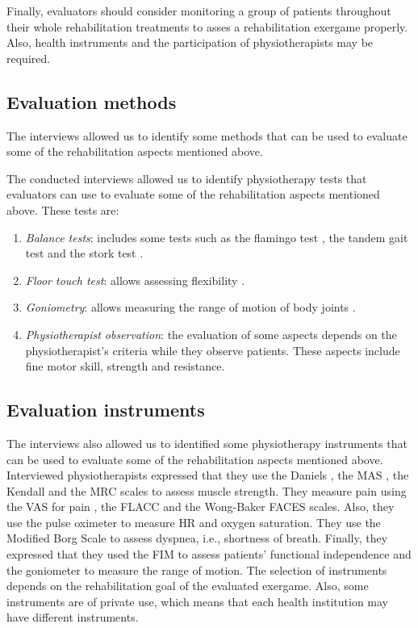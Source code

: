 Finally, evaluators should consider monitoring a group of patients throughout their whole rehabilitation treatments to asses a rehabilitation exergame properly. Also, health instruments and the participation of physiotherapists may be required.

\subsection{Evaluation methods}
\label{sec:rehab_methods}
The interviews allowed us to identify some methods that can be used to evaluate some of the rehabilitation aspects mentioned above. 

The conducted interviews allowed us to identify physiotherapy tests that evaluators can use to evaluate some of the rehabilitation aspects mentioned above. These tests are:

\begin{enumerate}
 \item \emph{Balance tests}: includes some tests such as the flamingo test \autocite{flamingo}, the tandem gait test \autocite{tandemGaitTest} and the stork test \autocite{storkTest}.
 
 \item \emph{Floor touch test}: allows assessing flexibility \autocite{floorTouch}.
 
 \item \emph{Goniometry}: allows measuring the range of motion of body joints \autocite{goniometry}.
 
 \item \emph{Physiotherapist observation}: the evaluation of some aspects depends on the physiotherapist's criteria while they observe patients. These aspects include fine motor skill, strength and resistance.
\end{enumerate}

\subsection{Evaluation instruments}
\label{sec:rehab_instruments}
The interviews also allowed us to identified some physiotherapy instruments that can be used to evaluate some of the rehabilitation aspects mentioned above. Interviewed physiotherapists expressed that they use the Daniels \autocite{danielsScale}, the \ac{MAS} \autocite{ashwortScale}, the Kendall and the \ac{MRC} \autocite{muscleStrenght} scales  to assess muscle strength. They measure pain using the \ac{VAS} for pain \autocite{painScales}, the \ac{FLACC} \autocite{flaccScale} and the Wong-Baker FACES \autocite{Baker} scales. Also, they use the pulse oximeter to measure \ac{HR} and oxygen saturation. They use the Modified Borg Scale to assess dyspnea, i.e., shortness of breath. Finally, they expressed that they used the \ac{FIM} \autocite{fim} to assess patients' functional independence and the goniometer \autocite{goniometry} to measure the range of motion. The selection of instruments depends on the rehabilitation goal of the evaluated exergame. Also, some instruments are of private use, which means that each health institution may have different instruments.

